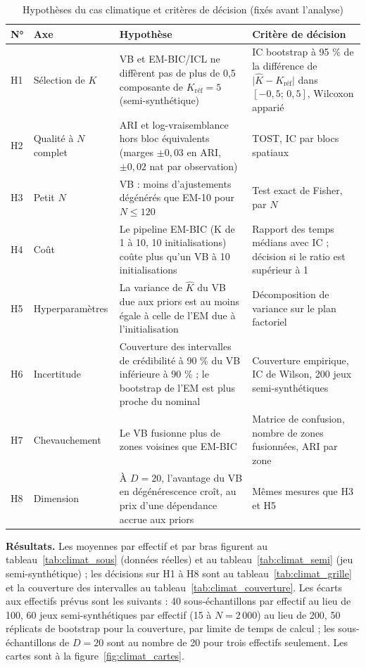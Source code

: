 \begin{table}[H]
\centering
\small
\setlength{\tabcolsep}{0.1cm}
\begin{tabular}{|p{0.9cm}|p{2.6cm}|p{5.4cm}|p{5.6cm}|}
\hline
\textbf{N°} & \textbf{Axe} & \textbf{Hypothèse} & \textbf{Critère de décision} \\
\hline
H1 & Sélection de $K$ & VB et EM-BIC/ICL ne diffèrent pas de plus de 0,5 composante de $K_{\text{réf}}=5$ (semi-synthétique) & IC bootstrap à 95 \% de la différence de $\lvert\hat K - K_{\text{réf}}\rvert$ dans $[-0{,}5;\,0{,}5]$, Wilcoxon apparié \\
\hline
H2 & Qualité à $N$ complet & ARI et log-vraisemblance hors bloc équivalents (marges $\pm0{,}03$ en ARI, $\pm0{,}02$ nat par observation) & TOST, IC par blocs spatiaux \\
\hline
H3 & Petit $N$ & VB : moins d'ajustements dégénérés que EM-10 pour $N \leq 120$ & Test exact de Fisher, par $N$ \\
\hline
H4 & Coût & Le pipeline EM-BIC (K de 1 à 10, 10 initialisations) coûte plus qu'un VB à 10 initialisations & Rapport des temps médians avec IC ; décision si le ratio est supérieur à 1 \\
\hline
H5 & Hyperparamètres & La variance de $\hat K$ du VB due aux priors est au moins égale à celle de l'EM due à l'initialisation & Décomposition de variance sur le plan factoriel \\
\hline
H6 & Incertitude & Couverture des intervalles de crédibilité à 90 \% du VB inférieure à 90 \% ; le bootstrap de l'EM est plus proche du nominal & Couverture empirique, IC de Wilson, 200 jeux semi-synthétiques \\
\hline
H7 & Chevauchement & Le VB fusionne plus de zones voisines que EM-BIC & Matrice de confusion, nombre de zones fusionnées, ARI par zone \\
\hline
H8 & Dimension & À $D=20$, l'avantage du VB en dégénérescence croît, au prix d'une dépendance accrue aux priors & Mêmes mesures que H3 et H5 \\
\hline
\end{tabular}
\caption{Hypothèses du cas climatique et critères de décision (fixés avant l'analyse)}
\label{tab:climat_hypotheses}
\end{table}

\textbf{Résultats. }Les moyennes par effectif et par bras figurent au tableau~\ref{tab:climat_sous} (données réelles) et au tableau~\ref{tab:climat_semi} (jeu semi-synthétique) ; les décisions sur H1 à H8 sont au tableau~\ref{tab:climat_grille} et la couverture des intervalles au tableau~\ref{tab:climat_couverture}. Les écarts aux effectifs prévus sont les suivants : 40 sous-échantillons par effectif au lieu de 100, 60 jeux semi-synthétiques par effectif (15 à $N=2\,000$) au lieu de 200, 50 réplicats de bootstrap pour la couverture, par limite de temps de calcul ; les sous-échantillons de $D=20$ sont au nombre de 20 pour trois effectifs seulement. Les cartes sont à la figure~\ref{fig:climat_cartes}.

